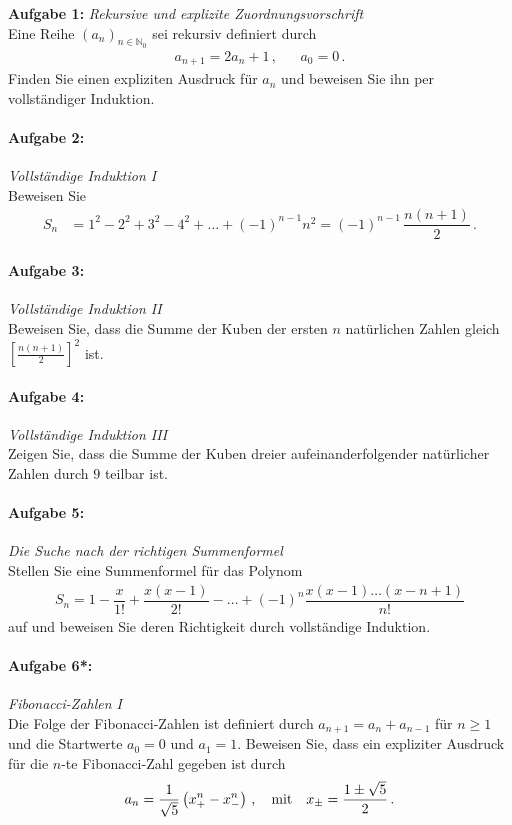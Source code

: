 
\textbf{Aufgabe 1: } \emph{Rekursive und explizite Zuordnungsvorschrift}\\[0.2cm]
Eine Reihe $(a_n)_{n\in\mathbb{N}_0}$ sei rekursiv definiert durch
\begin{align*}
a_{n+1}=2a_n+1\,, && a_0=0\,.
\end{align*}
Finden Sie einen expliziten Ausdruck für $a_n$ und beweisen Sie ihn per vollständiger Induktion.
%
%
\paragraph{Aufgabe 2: } \emph{Vollständige Induktion I}\\[0.2cm]
Beweisen Sie
\begin{align*}
S_n&=1^2-2^2+3^2-4^2+\hdots+(-1)^{n-1}n^2=(-1)^{n-1}\,\dfrac{n(n+1)}{2}\,.
\end{align*}
%
\paragraph{Aufgabe 3: } \emph{Vollständige Induktion II}\\[0.2cm]
Beweisen Sie, dass die Summe der Kuben der ersten $n$ natürlichen Zahlen gleich $\left[\frac{n(n+1)}{2}\right]^2$ ist. 
%
\paragraph{Aufgabe 4: } \emph{Vollständige Induktion III}\\[0.2cm]
Zeigen Sie, dass die Summe der Kuben dreier aufeinanderfolgender natürlicher Zahlen durch $9$ teilbar ist.
%
\paragraph{Aufgabe 5: } \emph{Die Suche nach der richtigen Summenformel}\\[0.2cm]
Stellen Sie eine Summenformel für das Polynom
\begin{align*}
S_n = 1-\dfrac{x}{1!}+\dfrac{x(x-1)}{2!}-\hdots+(-1)^n \dfrac{x(x-1)\dots(x-n+1)}{n!}
\end{align*}
auf und beweisen Sie deren Richtigkeit durch vollständige Induktion.
%
\paragraph{Aufgabe 6*: } \emph{Fibonacci-Zahlen I}\\[0.2cm]
Die Folge der Fibonacci-Zahlen ist definiert durch $a_{n+1}=a_n+a_{n-1}$ für $n\ge 1$ und die Startwerte $a_0=0$ und $a_1=1$. Beweisen Sie, dass ein expliziter Ausdruck für die $n$-te Fibonacci-Zahl gegeben ist durch
\begin{align*}
a_n=\frac{1}{\sqrt{5}}\left(x_+^n-x_-^n\right)\,, \qq{mit} x_{\pm}=\frac{1\pm\sqrt{5}}{2}\,.
\end{align*}